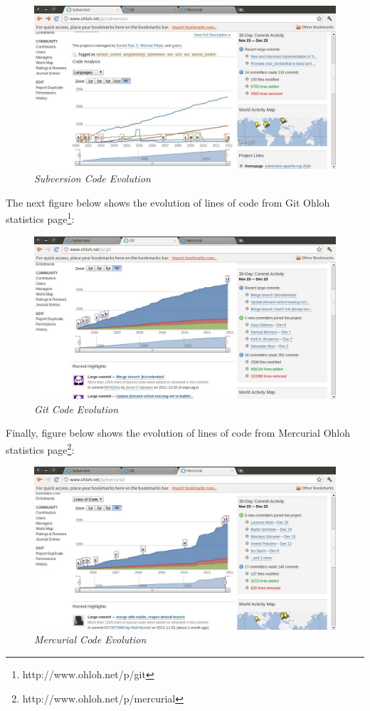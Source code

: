 \documentclass[a4paper,10pt]{article}
\begin{document}
\begin{figure}[H]
    \centering
    \includegraphics[width=15cm, keepaspectratio]{img/SVNohloh.jpg}
    \caption{\textit{Subversion Code Evolution}}
    \label{figure:svncodeevolution}
 \end{figure}

The next figure below shows the evolution of lines of code from Git Ohloh statistics page\footnote{http://www.ohloh.net/p/git}:

\begin{figure}[H]
    \centering
    \includegraphics[width=15cm, keepaspectratio]{img/GITohloh.jpg}
    \caption{\textit{Git Code Evolution}}
    \label{figure:gitcodeevolution}
 \end{figure}

Finally, figure below shows the evolution of lines of code from Mercurial Ohloh statistics page\footnote{http://www.ohloh.net/p/mercurial}:

\begin{figure}[H]
    \centering
    \includegraphics[width=15cm, keepaspectratio]{img/MERCURIALohloh.jpg}
    \caption{\textit{Mercurial Code Evolution}}
    \label{figure:mercurialcodeevolution}
 \end{figure}
\end{document}
